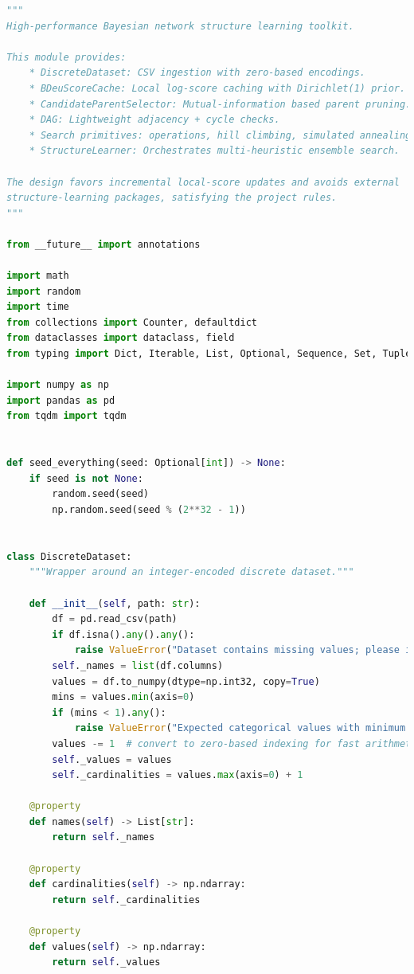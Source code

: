 \documentclass[twoside,11pt]{article}
\begin{document}
\begin{algorithm}
\begin{lstlisting}[language=Python]
"""
High-performance Bayesian network structure learning toolkit.

This module provides:
    * DiscreteDataset: CSV ingestion with zero-based encodings.
    * BDeuScoreCache: Local log-score caching with Dirichlet(1) prior.
    * CandidateParentSelector: Mutual-information based parent pruning.
    * DAG: Lightweight adjacency + cycle checks.
    * Search primitives: operations, hill climbing, simulated annealing, GA.
    * StructureLearner: Orchestrates multi-heuristic ensemble search.

The design favors incremental local-score updates and avoids external
structure-learning packages, satisfying the project rules.
"""

from __future__ import annotations

import math
import random
import time
from collections import Counter, defaultdict
from dataclasses import dataclass, field
from typing import Dict, Iterable, List, Optional, Sequence, Set, Tuple

import numpy as np
import pandas as pd
from tqdm import tqdm


def seed_everything(seed: Optional[int]) -> None:
    if seed is not None:
        random.seed(seed)
        np.random.seed(seed % (2**32 - 1))


class DiscreteDataset:
    """Wrapper around an integer-encoded discrete dataset."""

    def __init__(self, path: str):
        df = pd.read_csv(path)
        if df.isna().any().any():
            raise ValueError("Dataset contains missing values; please impute first.")
        self._names = list(df.columns)
        values = df.to_numpy(dtype=np.int32, copy=True)
        mins = values.min(axis=0)
        if (mins < 1).any():
            raise ValueError("Expected categorical values with minimum 1 per column.")
        values -= 1  # convert to zero-based indexing for fast arithmetic
        self._values = values
        self._cardinalities = values.max(axis=0) + 1

    @property
    def names(self) -> List[str]:
        return self._names

    @property
    def cardinalities(self) -> np.ndarray:
        return self._cardinalities

    @property
    def values(self) -> np.ndarray:
        return self._values


\end{lstlisting}
\end{algorithm}
\end{document}
